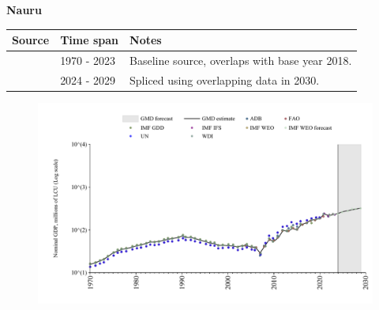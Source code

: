 \documentclass[12pt,a4paper,landscape]{article}
\begin{document}
\begin{adjustbox}{max totalsize={\paperwidth}{\paperheight},center}
\begin{minipage}[t][\textheight][t]{\textwidth}
\vspace*{0.5cm}
{}
\begin{center}
{\Large\bfseries Nauru}
\end{center}
\vspace{0.5cm}
\begin{table}[H]
\centering
\small
\begin{tabular}{|l|l|l|}
\hline
\textbf{Source} & \textbf{Time span} & \textbf{Notes} \\
\hline
\rowcolor{white}\cite{WDI}& 1970 - 2023 &Baseline source, overlaps with base year 2018.\\
\rowcolor{lightgray}\cite{IMF_WEO_forecast}& 2024 - 2029 &Spliced using overlapping data in 2030.\\
\hline
\end{tabular}
\end{table}
\begin{figure}[H]
\centering
\includegraphics[width=\textwidth,height=0.6\textheight,keepaspectratio]{graphs/NRU_nGDP.pdf}
\end{figure}
\end{minipage}
\end{adjustbox}
\end{document}
